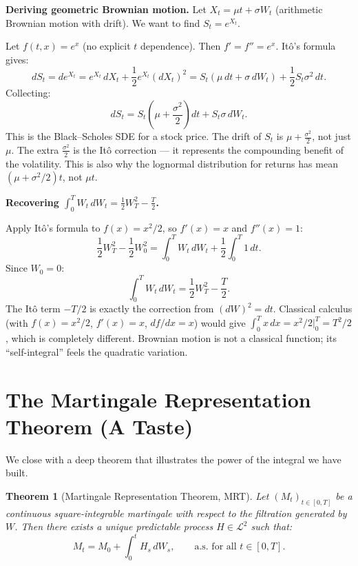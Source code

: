 \documentclass[11pt,a4paper]{article}
\theoremstyle{definition}
\theoremstyle{plain}
\newtheorem{theorem}{Theorem}[section]
\theoremstyle{remark}
\newcommand{\calL}{\mathcal{L}}
\begin{document}
\begin{workedex}
\textbf{Deriving geometric Brownian motion.}
Let $X_t = \mu t + \sigma W_t$ (arithmetic Brownian motion with drift). We want to find $S_t = e^{X_t}$.

Let $f(t,x) = e^x$ (no explicit $t$ dependence). Then $f' = f'' = e^x$. Itô's formula gives:
\[
  dS_t = de^{X_t} = e^{X_t}\,dX_t + \frac{1}{2}e^{X_t}(dX_t)^2 = S_t(\mu\,dt + \sigma\,dW_t) + \frac{1}{2}S_t\sigma^2\,dt.
\]
Collecting:
\[
  dS_t = S_t\left(\mu + \frac{\sigma^2}{2}\right)dt + S_t\sigma\,dW_t.
\]
This is the Black--Scholes SDE for a stock price. The drift of $S_t$ is $\mu + \frac{\sigma^2}{2}$, not just $\mu$. The extra $\frac{\sigma^2}{2}$ is the Itô correction — it represents the compounding benefit of the volatility. This is also why the lognormal distribution for returns has mean $(\mu + \sigma^2/2)t$, not $\mu t$.
\end{workedex}

\begin{workedex}
\textbf{Recovering $\int_0^T W_t\,dW_t = \frac{1}{2}W_T^2 - \frac{T}{2}$.}

Apply Itô's formula to $f(x) = x^2/2$, so $f'(x) = x$ and $f''(x) = 1$:
\[
  \frac{1}{2}W_T^2 - \frac{1}{2}W_0^2 = \int_0^T W_t\,dW_t + \frac{1}{2}\int_0^T 1\,dt.
\]
Since $W_0 = 0$:
\[
  \int_0^T W_t\,dW_t = \frac{1}{2}W_T^2 - \frac{T}{2}.
\]
The Itô term $-T/2$ is exactly the correction from $(dW)^2 = dt$. Classical calculus (with $f(x) = x^2/2$, $f'(x) = x$, $df/dx = x$) would give $\int_0^T x\,dx = x^2/2|_0^T = T^2/2$, which is completely different. Brownian motion is not a classical function; its ``self-integral'' feels the quadratic variation.
\end{workedex}

\section{The Martingale Representation Theorem (A Taste)}
\label{sec:mrt}

We close with a deep theorem that illustrates the power of the integral we have built.

\begin{theorem}[Martingale Representation Theorem, MRT]
Let $(M_t)_{t \in [0,T]}$ be a continuous square-integrable martingale with respect to the filtration generated by $W$. Then there exists a unique predictable process $H \in \calL^2$ such that:
\[
  M_t = M_0 + \int_0^t H_s\,dW_s, \qquad \text{a.s. for all } t \in [0,T].
\]
\end{theorem}
\end{document}
